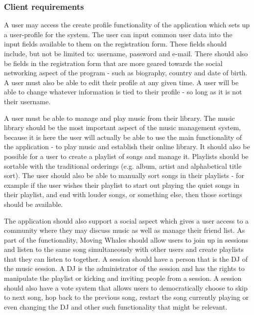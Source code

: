 \subsubsection{Client requirements}

A user may access the create profile functionality of the application which sets 
up a user-profile for the system. The user can input common user data into the 
input fields available to them on the registration form. These fields 
should include, but not be limited to: username, password and e-mail. 
There should also be fields in the registration form that are more geared
towards the social networking aspect of the program - such as biography, 
country and date of birth. 
\vspace{10pt}
A user must also be able to edit their profile at any given time. A user will 
be able to change whatever information is tied to their profile - 
so long as it is not their username. 

A user must be able to manage and play music from their 
library. The music library should be the most important aspect of the music 
management system, because it is here the user will actually be able to use 
the main functionality of the application - to play music and establish their 
online library. It should also be possible for a user to create a playlist of 
songs and manage it. Playlists should be 
sortable with the traditional orderings (e.g. album, artist and alphabetical 
title sort). The user should also be able to manually sort songs in their
playlists - for example if the user wishes their playlist to start out playing
the quiet songs in their playlist, and end with louder songs, or something else, 
then those sortings should be available.

The application should also support a social aspect which gives a user access to
a community where they may discuss music as well as manage their friend list.
As part of the functionality, Moving Whales should allow users to join up in
sessions and listen to the same song simultaneously with other users and create 
playlists that they can listen to together. A session should have a person that
is the DJ of the music session. A DJ is the administrator of the session and has 
the rights to manipulate the playlist or kicking and inviting people from a 
session. A session should also have a vote system that allows users to 
democratically choose to skip to next song, hop back to the previous song, 
restart the song currently playing or even changing the DJ and other such 
functionality that might be relevant.